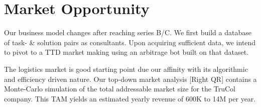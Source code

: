 \vspace{-0.16cm}
\section{Market Opportunity}
\vspace{-0.15cm}
Our business model changes after reaching series B/C. We first build a database of task- \& solution pairs as consultants. Upon acquiring sufficient data, we intend to pivot to a TTD market making using an arbitrage bot built on that dataset.

\noindent The logistics market is good starting point due our affinity with its algorithmic and efficiency driven nature. Our top-down market analysis [Right QR] contains a Monte-Carlo simulation of the total addressable market size for the TruCol company. This TAM yields an estimated yearly revenue of 600K to 14M per year.
